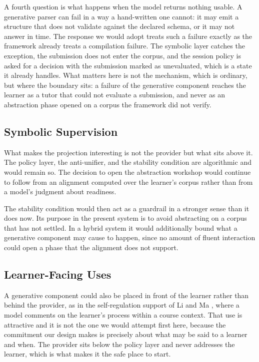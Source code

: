 \documentclass[journal]{IEEEtran}
\begin{document}
A fourth question is what happens when the model returns nothing usable. A generative parser can fail in a way a hand-written one cannot: it may emit a structure that does not validate against the declared schema, or it may not answer in time. The response we would adopt treats such a failure exactly as the framework already treats a compilation failure. The symbolic layer catches the exception, the submission does not enter the corpus, and the session policy is asked for a decision with the submission marked as unevaluated, which is a state it already handles. What matters here is not the mechanism, which is ordinary, but where the boundary sits: a failure of the generative component reaches the learner as a tutor that could not evaluate a submission, and never as an abstraction phase opened on a corpus the framework did not verify.

\subsection{Symbolic Supervision}\label{sec:10.3}
What makes the projection interesting is not the provider but what sits above it. The policy layer, the anti-unifier, and the stability condition are algorithmic and would remain so. The decision to open the abstraction workshop would continue to follow from an alignment computed over the learner's corpus rather than from a model's judgment about readiness.

The stability condition would then act as a guardrail in a stronger sense than it does now. Its purpose in the present system is to avoid abstracting on a corpus that has not settled. In a hybrid system it would additionally bound what a generative component may cause to happen, since no amount of fluent interaction could open a phase that the alignment does not support.

\subsection{Learner-Facing Uses}\label{sec:10.4}
A generative component could also be placed in front of the learner rather than
behind the provider, as in the self-regulation support of Li and Ma \cite{b25}, where a
model comments on the learner's process within a course context. That use is
attractive and it is not the one we would attempt first here, because the
commitment our design makes is precisely about what may be said to a learner and
when. The provider sits below the policy layer and never addresses the learner,
which is what makes it the safe place to start.
\end{document}
